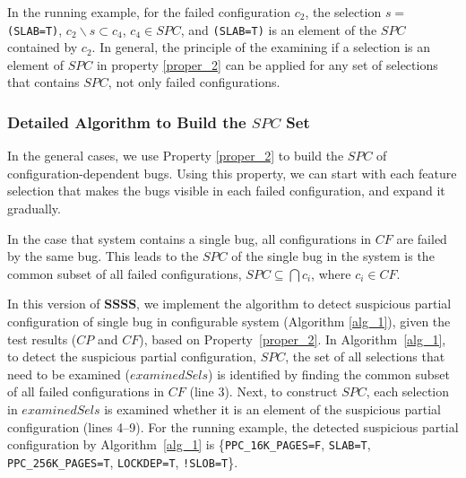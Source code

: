 In the running example, for the failed configuration $c_2$, the
selection $s=$\texttt{(SLAB=T)}, $c_2 \backslash s \subset c_4$, $c_4
\in SPC$, and \texttt{(SLAB=T)} is an element of the $SPC$ contained
by $c_2$. In general, the principle of the examining if a selection is
an element of $SPC$ in property \ref{proper_2} can be applied for any
set of selections that contains $SPC$, not only failed configurations.
%

\subsubsection{Detailed Algorithm to Build the $SPC$ Set}

In the general cases, we use Property \ref{proper_2} to build the $SPC$
of configuration-dependent bugs. Using this property, we can start
with each feature selection that makes the bugs visible in each failed
configuration, and expand it gradually.
%

In the case that system contains a single bug, all configurations in
$CF$ are failed by the same bug. This leads to the $SPC$ of the single
bug in the system is the common subset of all failed configurations,
$SPC \subseteq \bigcap {c_i}$, where $c_i \in CF$.



In this version of \textbf{SSSS}, we implement the algorithm to detect
suspicious partial configuration of single bug in configurable system
(Algorithm \ref{alg_1}), given the test results ($CP$ and $CF$), based
on Property~\ref{proper_2}. In Algorithm~\ref{alg_1}, to detect the
suspicious partial configuration, $SPC$, the set of all
selections that need to be examined ($examinedSels$) is identified by
finding the common subset of all failed configurations in $CF$ (line
3). Next, to construct $SPC$, each selection in
$examinedSels$ is examined whether it is an element of the
suspicious partial configuration (lines 4--9).
%
For the running example, the detected suspicious partial configuration
by Algorithm~\ref{alg_1} is \{\texttt{PPC\_16K\_PAGES=F},
\texttt{SLAB=T}, \texttt{PPC\_256K\_PAGES=T}, \texttt{LOCKDEP=T},
\texttt{!SLOB=T}\}.
